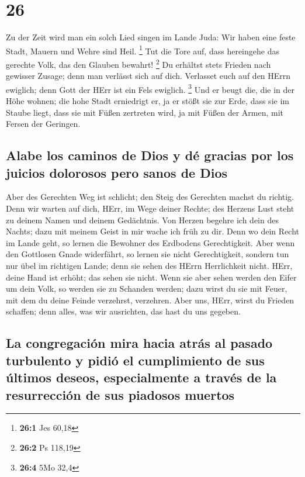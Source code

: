 \hypertarget{section-25}{%
\section{26}\label{section-25}}

 Zu der Zeit wird man ein solch Lied singen im Lande Juda:
Wir haben eine feste Stadt, Mauern und Wehre sind Heil. \footnote{\textbf{26:1}
  Jes 60,18}  Tut die Tore auf, dass hereingehe das
gerechte Volk, das den Glauben bewahrt! \footnote{\textbf{26:2} Ps
  118,19}  Du erhältst stets Frieden nach gewisser Zusage;
denn man verlässt sich auf dich.  Verlasset euch auf den
HErrn ewiglich; denn Gott der HErr ist ein Fels ewiglich. \footnote{\textbf{26:4}
  5Mo 32,4}  Und er beugt die, die in der Höhe wohnen; die
hohe Stadt erniedrigt er, ja er stößt sie zur Erde, dass sie im Staube
liegt,  dass sie mit Füßen zertreten wird, ja mit Füßen
der Armen, mit Fersen der Geringen.

\hypertarget{alabe-los-caminos-de-dios-y-duxe9-gracias-por-los-juicios-dolorosos-pero-sanos-de-dios}{%
\subsection{Alabe los caminos de Dios y dé gracias por los juicios
dolorosos pero sanos de
Dios}\label{alabe-los-caminos-de-dios-y-duxe9-gracias-por-los-juicios-dolorosos-pero-sanos-de-dios}}

 Aber des Gerechten Weg ist schlicht; den Steig des
Gerechten machst du richtig.  Denn wir warten auf dich,
HErr, im Wege deiner Rechte; des Herzens Lust steht zu deinem Namen und
deinem Gedächtnis.  Von Herzen begehre ich dein des
Nachts; dazu mit meinem Geist in mir wache ich früh zu dir. Denn wo dein
Recht im Lande geht, so lernen die Bewohner des Erdbodens Gerechtigkeit.
 Aber wenn den Gottlosen Gnade widerfährt, so lernen sie
nicht Gerechtigkeit, sondern tun nur übel im richtigen Lande; denn sie
sehen des HErrn Herrlichkeit nicht.  HErr, deine Hand ist
erhöht; das sehen sie nicht. Wenn sie aber sehen werden den Eifer um
dein Volk, so werden sie zu Schanden werden; dazu wirst du sie mit
Feuer, mit dem du deine Feinde verzehrst, verzehren. 
Aber uns, HErr, wirst du Frieden schaffen; denn alles, was wir
ausrichten, das hast du uns gegeben.

\hypertarget{la-congregaciuxf3n-mira-hacia-atruxe1s-al-pasado-turbulento-y-pidiuxf3-el-cumplimiento-de-sus-uxfaltimos-deseos-especialmente-a-travuxe9s-de-la-resurrecciuxf3n-de-sus-piadosos-muertos}{%
\subsection{La congregación mira hacia atrás al pasado turbulento y
pidió el cumplimiento de sus últimos deseos, especialmente a través de
la resurrección de sus piadosos
muertos}\label{la-congregaciuxf3n-mira-hacia-atruxe1s-al-pasado-turbulento-y-pidiuxf3-el-cumplimiento-de-sus-uxfaltimos-deseos-especialmente-a-travuxe9s-de-la-resurrecciuxf3n-de-sus-piadosos-muertos}}


